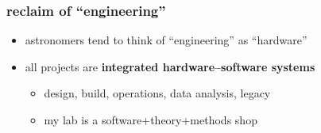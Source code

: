 \documentclass{beamer}
\renewcommand{\emph}[1]{\textbf{#1}}
\begin{document}
\begin{frame}
  \frametitle{reclaim of ``engineering''}
  \begin{itemize}
  \item astronomers tend to think of ``engineering'' as ``hardware''
  \item all projects are \emph{integrated hardware--software systems}
    \begin{itemize}
    \item design, build, operations, data analysis, legacy
    \item my lab is a software+theory+methods shop
    \end{itemize}
  \end{itemize}
\end{frame}
\end{document}
